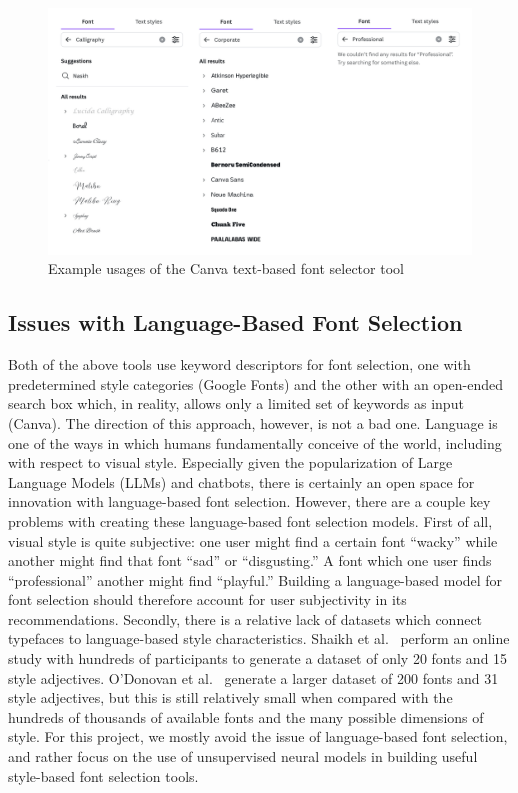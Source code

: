 \begin{figure}
    \centering
    \includegraphics[width=.95\textwidth]{images/canva-font-selector.png}
    \caption{Example usages of the Canva text-based font selector tool}
    \label{fig:canva-font-selector}
\end{figure}

\subsection{Issues with Language-Based Font Selection}

Both of the above tools use keyword descriptors for font selection, one with predetermined style categories (Google Fonts) and the other with an open-ended search box which, in reality, allows only a limited set of keywords as input (Canva). The direction of this approach, however, is not a bad one. Language is one of the ways in which humans fundamentally conceive of the world, including with respect to visual style. Especially given the popularization of Large Language Models (LLMs) and chatbots, there is certainly an open space for innovation with language-based font selection. However, there are a couple key problems with creating these language-based font selection models. First of all, visual style is quite subjective: one user might find a certain font ``wacky'' while another might find that font ``sad'' or ``disgusting.'' A font which one user finds ``professional'' another might find ``playful.'' Building a language-based model for font selection should therefore account for user subjectivity in its recommendations. Secondly, there is a relative lack of datasets which connect typefaces to language-based style characteristics. Shaikh et al.\ \cite{shaikh2006} perform an online study with hundreds of participants to generate a dataset of only 20 fonts and 15 style adjectives. O'Donovan et al.\ \cite{odonovan2014} generate a larger dataset of 200 fonts and 31 style adjectives, but this is still relatively small when compared with the hundreds of thousands of available fonts and the many possible dimensions of style. For this project, we mostly avoid the issue of language-based font selection, and rather focus on the use of unsupervised neural models in building useful style-based font selection tools.

